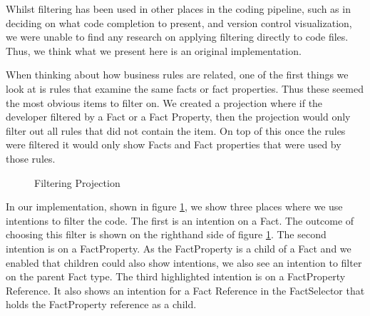 Whilst filtering has been used in other places in the coding pipeline, such as in deciding on what code completion to present\cite{hou2010towards}, and version control visualization\cite{yoon2013visualization}, we were unable to find any research on applying filtering directly to code files.
Thus, we think what we present here is an original implementation.

When thinking about how business rules are related, one of the first things we look at is rules that examine the same facts or fact properties.
Thus these seemed the most obvious items to filter on.
We created a projection where if the developer filtered by a Fact or a Fact Property, then the projection would only filter out all rules that did not contain the item.
On top of this once the rules were filtered it would only show Facts and Fact properties that were used by those rules.

\begin{figure}[h]
    \centering
    \caption{Filtering Projection}
    \label{fig:filteringProjection}
\end{figure}

In our implementation, shown in figure \ref{fig:filteringProjection}, we show three places where we use intentions to filter the code.
The first is an intention on a Fact.
The outcome of choosing this filter is shown on the righthand side of figure \ref{fig:filteringProjection}.
The second intention is on a FactProperty. 
As the FactProperty is a child of a Fact and we enabled that children could also show intentions, we also see an intention to filter on the parent Fact type.
The third highlighted intention is on a FactProperty Reference.
It also shows an intention for a Fact Reference in the FactSelector that holds the FactProperty reference as a child.

